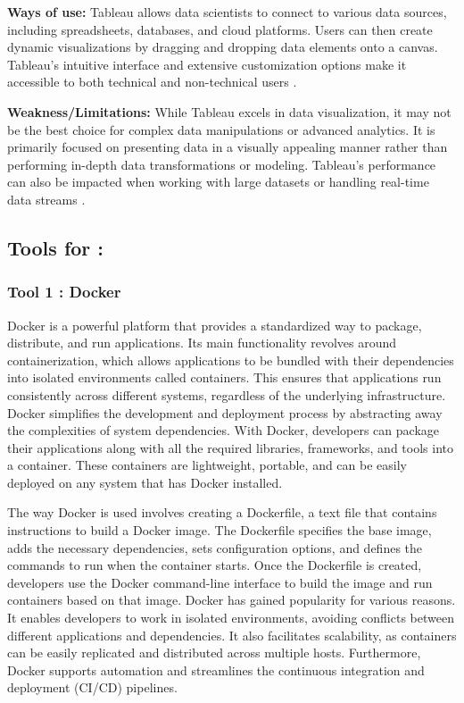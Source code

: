 \documentclass[a4paper, 11pt]{report}
\begin{document}
\textbf{Ways of use:} Tableau allows data scientists to connect to various data sources, including spreadsheets, databases, and cloud platforms. Users can then create dynamic visualizations by dragging and dropping data elements onto a canvas. Tableau's intuitive interface and extensive customization options make it accessible to both technical and non-technical users \cite{tableau1}.

\textbf{Weakness/Limitations:} While Tableau excels in data visualization, it may not be the best choice for complex data manipulations or advanced analytics. It is primarily focused on presenting data in a visually appealing manner rather than performing in-depth data transformations or modeling. Tableau's performance can also be impacted when working with large datasets or handling real-time data streams \cite{tableau2}.



\subsection{Tools for \majC: \studC}

\subsubsection{Tool 1 : Docker}

Docker is a powerful platform that provides a standardized way to package, distribute, and run applications. Its main functionality revolves around containerization, which allows applications to be bundled with their dependencies into isolated environments called containers.  \cite{infoworld}  This ensures that applications run consistently across different systems, regardless of the underlying infrastructure. Docker simplifies the development and deployment process by abstracting away the complexities of system dependencies. With Docker, developers can package their applications along with all the required libraries, frameworks, and tools into a container. These containers are lightweight, portable, and can be easily deployed on any system that has Docker installed. 

\cite{docker}  The way Docker is used involves creating a Dockerfile, a text file that contains instructions to build a Docker image. The Dockerfile specifies the base image, adds the necessary dependencies, sets configuration options, and defines the commands to run when the container starts. Once the Dockerfile is created, developers use the Docker command-line interface to build the image and run containers based on that image. Docker has gained popularity for various reasons. It enables developers to work in isolated environments, avoiding conflicts between different applications and dependencies. It also facilitates scalability, as containers can be easily replicated and distributed across multiple hosts. Furthermore, Docker supports automation and streamlines the continuous integration and deployment (CI/CD) pipelines. 
\end{document}
